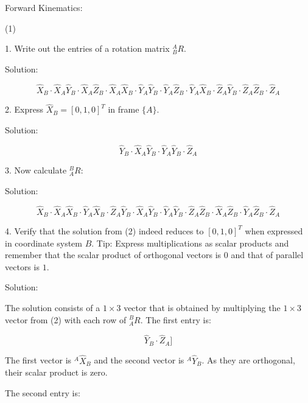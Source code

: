 Forward Kinematics:

(1)

1. Write out the entries of a rotation matrix $^A_BR$.

Solution:

\begin{equation*}
\hat{X}_B\cdot\hat{X}_A  \hat{Y}_B\cdot\hat{X}_A   \hat{Z}_B\cdot\hat{X}_A
\hat{X}_B\cdot\hat{Y}_A  \hat{Y}_B\cdot\hat{Y}_A   \hat{Z}_B\cdot\hat{Y}_A
\hat{X}_B\cdot\hat{Z}_A  \hat{Y}_B\cdot\hat{Z}_A   \hat{Z}_B\cdot\hat{Z}_A
\end{equation*}

2. Express $\hat{X}_B=[0, 1, 0]^T$ in frame $\{A\}$.

Solution:

\begin{equation*}
\hat{Y}_B\cdot\hat{X}_A
\hat{Y}_B\cdot\hat{Y}_A
\hat{Y}_B\cdot\hat{Z}_A
\end{equation*}

3. Now calculate $^B_AR$:

Solution:

\begin{equation*}
\hat{X}_B\cdot\hat{X}_A  \hat{X}_B\cdot\hat{Y}_A   \hat{X}_B\cdot\hat{Z}_A
\hat{Y}_B\cdot\hat{X}_A  \hat{Y}_B\cdot\hat{Y}_A   \hat{Y}_B\cdot\hat{Z}_A
\hat{Z}_B\cdot\hat{X}_A  \hat{Z}_B\cdot\hat{Y}_A   \hat{Z}_B\cdot\hat{Z}_A
\end{equation*}

4. Verify that the solution from (2) indeed reduces to $[0, 1, 0]^T$ when expressed in coordinate system $B$. Tip: Express multiplications as scalar products and remember that the scalar product of orthogonal vectors is $0$ and that of parallel vectors is $1$.

Solution:

The solution consists of a $1 \times 3$ vector that is obtained by multiplying the $1 \times 3$ vector from (2) with each row of $^B_AR$.  The first entry is:

\begin{equation*}
[\hat{X}_B\cdot\hat{X}_A   [\hat{Y}_B\cdot\hat{X}_A+
\hat{X}_B\cdot\hat{Y}_A  .  \hat{Y}_B\cdot\hat{Y}_A+
\hat{X}_B\cdot\hat{Z}_A]    \hat{Y}_B\cdot\hat{Z}_A]
\end{equation*}

The first vector is $^A\hat{X}_B$ and the second vector is $^A\hat{Y}_B$. As they are orthogonal, their scalar product is zero.

The second entry is:

